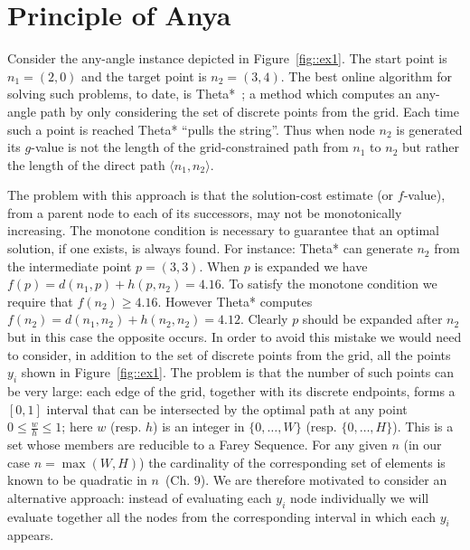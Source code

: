 \section{Principle of Anya}
Consider the any-angle instance depicted in Figure~\ref{fig::ex1}. 
The start point is $n_1 = (2, 0)$ and the target
point is $n_2 = (3, 4)$.  The best online algorithm for solving such
problems, to date, is Theta*~\cite{nash07}; a method which computes
an any-angle path by only considering the set of discrete points from 
the grid. 
Each time such a point is reached Theta* ``pulls the string''.  
Thus when node $n_2$ is generated its $g$-value is not
the length of the grid-constrained path from $n_1$ to $n_2$
but rather the length of the direct path $\langle n_1, n_2 \rangle$.

%    

The problem with this approach is that the solution-cost estimate
(or $f$-value), from a parent node to each of its successors, may 
not be monotonically increasing.  The monotone condition is
necessary to guarantee that an optimal solution, if one exists, is always found.
For instance: Theta* can generate $n_2$ from the intermediate point $p = (3,3)$.
When $p$ is expanded we have $f(p) = d(n_1, p) + h(p, n_2) = 4.16$. 
To satisfy the monotone condition we require that $f(n_2) \geq 4.16$. However 
Theta* computes $f(n_2) = d(n_1, n_2) + h(n_2, n_2) = 4.12$.
Clearly $p$ should be expanded after $n_2$ but in this case the opposite occurs.  
In order to avoid this mistake we would need to consider, in addition to the
set of discrete points from the grid, all the points $y_i$ shown in Figure~\ref{fig::ex1}.
The problem is that the number of such points can be very large:
each edge of the grid, together with its discrete endpoints, 
forms a $[0, 1]$ interval that can be intersected by the optimal
path at any point $0 \leq \frac{w}{h} \leq 1$; here $w$ (resp. $h$) is an integer in
$\{0,\dots,W\}$ (resp.  $\{0,\dots,H\}$).
This is a set whose members are reducible to a Farey Sequence.
For any given $n$ (in our case $n = \max(W, H)$) the cardinality of the corresponding 
set of elements is known to be quadratic in $n$~\cite{concrete89}(Ch. 9).
We are therefore motivated to consider an alternative approach: instead
of evaluating each $y_i$ node individually we will evaluate together
all the nodes from the corresponding interval in which each $y_i$ appears.


